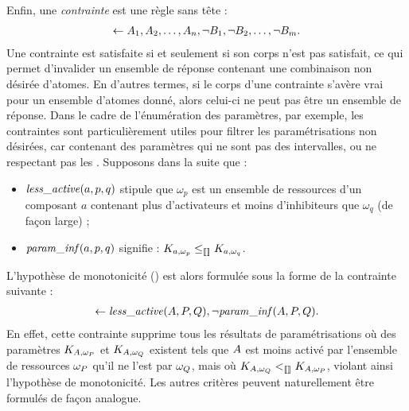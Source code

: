 Enfin, une \emph{contrainte} est une règle sans tête :
\begin{align*}
  \leftarrow A_1, A_2, \dots, A_n, \neg B_1, \neg B_2, \dots,
  \neg B_m.
\end{align*}
Une contrainte est satisfaite si et seulement si son corps n'est pas satisfait,
ce qui permet d'invalider un ensemble de réponse contenant une combinaison non
désirée d'atomes.
En d'autres termes, si le corps d'une contrainte s'avère vrai pour un ensemble d'atomes
donné, alors celui-ci ne peut pas être un ensemble de réponse.
Dans le cadre de l'énumération des paramètres, par exemple, les contraintes
sont particulièrement utiles pour filtrer les paramétrisations non désirées,
car contenant des paramètres qui ne sont pas des intervalles,
ou ne respectant pas les \enumparamcr.
Supposons dans la suite que :
\begin{itemize}
  \item $\mathit{less\_active}(a, p, q)$ stipule que $\omega_p$ est un ensemble de ressources
    d'un composant $a$ contenant plus d'activateurs et moins d'inhibiteurs que $\omega_q$
    (de façon large) ;
  \item $\mathit{param\_inf}(a, p, q)$ signifie : $K_{a,\omega_p} \leq_{\llbracket\rrbracket} K_{a,\omega_q}$.
\end{itemize}
L'hypothèse de monotonicité () est alors formulée
sous la forme de la contrainte suivante :
\label{impl-monotonicity}
\begin{align*}
  \leftarrow \mathit{less\_active}(A, P, Q), \neg \mathit{param\_inf}(A, P, Q).
\end{align*}
En effet, cette contrainte supprime tous les résultats de paramétrisations où
des paramètres $K_{A,\omega_P}$ et $K_{A,\omega_Q}$ existent
tels que $A$ est moins activé par l'ensemble de ressources $\omega_P$
qu'il ne l'est par $\omega_Q$,
mais où $K_{A,\omega_Q} <_{\llbracket\rrbracket} K_{A,\omega_P}$,
violant ainsi l'hypothèse de monotonicité.
Les autres critères peuvent naturellement être formulés de façon analogue.

